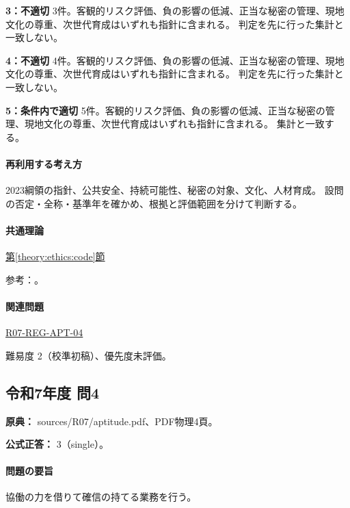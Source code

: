 \noindent\textbf{3：不適切} 3件。客観的リスク評価、負の影響の低減、正当な秘密の管理、現地文化の尊重、次世代育成はいずれも指針に含まれる。 判定を先に行った集計と一致しない。\par

\noindent\textbf{4：不適切} 4件。客観的リスク評価、負の影響の低減、正当な秘密の管理、現地文化の尊重、次世代育成はいずれも指針に含まれる。 判定を先に行った集計と一致しない。\par

\noindent\textbf{5：条件内で適切} 5件。客観的リスク評価、負の影響の低減、正当な秘密の管理、現地文化の尊重、次世代育成はいずれも指針に含まれる。 集計と一致する。\par

\paragraph{再利用する考え方} 2023綱領の指針、公共安全、持続可能性、秘密の対象、文化、人材育成。 設問の否定・全称・基準年を確かめ、根拠と評価範囲を分けて判断する。

\paragraph{共通理論} \hyperref[theory:ethics:code]{第\ref*{theory:ethics:code}節}

\par 参考：\cite{ipej_ethics2023}。

\paragraph{関連問題} \hyperref[q:r07-reg-apt-04]{R07-REG-APT-04}

\par 難易度 2（校準初稿）、優先度未評価。

\subsection{令和7年度 問4}
\label{q:r07-reg-apt-04}

\noindent\textbf{原典：} sources/R07/aptitude.pdf、PDF物理4頁。

\textbf{公式正答：} 3（single）。

\paragraph{問題の要旨} 協働の力を借りて確信の持てる業務を行う。

